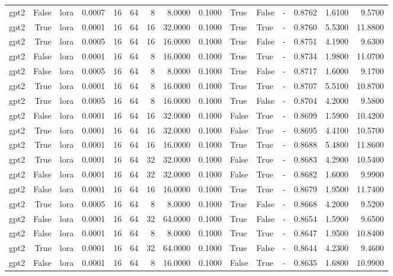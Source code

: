 \begin{tabular}{lrlrrrrrrlllrrr}
gpt2 & False & lora & 0.0007 & 16 & 64 & 8 & 8.0000 & 0.1000 & True & False & - & 0.8762 & 1.6100 & 9.5700 \\
gpt2 & True & lora & 0.0001 & 16 & 64 & 16 & 32.0000 & 0.1000 & True & True & - & 0.8760 & 5.5300 & 11.8800 \\
gpt2 & True & lora & 0.0005 & 16 & 64 & 16 & 16.0000 & 0.1000 & True & False & - & 0.8751 & 4.1900 & 9.6300 \\
gpt2 & False & lora & 0.0001 & 16 & 64 & 8 & 16.0000 & 0.1000 & True & True & - & 0.8734 & 1.9800 & 11.0700 \\
gpt2 & False & lora & 0.0005 & 16 & 64 & 8 & 8.0000 & 0.1000 & True & False & - & 0.8717 & 1.6000 & 9.1700 \\
gpt2 & True & lora & 0.0001 & 16 & 64 & 8 & 16.0000 & 0.1000 & True & True & - & 0.8707 & 5.5100 & 10.8700 \\
gpt2 & True & lora & 0.0005 & 16 & 64 & 8 & 16.0000 & 0.1000 & True & False & - & 0.8704 & 4.2000 & 9.5800 \\
gpt2 & False & lora & 0.0001 & 16 & 64 & 16 & 32.0000 & 0.1000 & False & True & - & 0.8699 & 1.5900 & 10.4200 \\
gpt2 & True & lora & 0.0001 & 16 & 64 & 16 & 32.0000 & 0.1000 & False & True & - & 0.8695 & 4.4100 & 10.5700 \\
gpt2 & True & lora & 0.0001 & 16 & 64 & 16 & 16.0000 & 0.1000 & True & True & - & 0.8688 & 5.4800 & 11.8600 \\
gpt2 & True & lora & 0.0001 & 16 & 64 & 32 & 32.0000 & 0.1000 & False & True & - & 0.8683 & 4.2900 & 10.5400 \\
gpt2 & False & lora & 0.0001 & 16 & 64 & 32 & 32.0000 & 0.1000 & False & True & - & 0.8682 & 1.6000 & 9.9900 \\
gpt2 & False & lora & 0.0001 & 16 & 64 & 16 & 16.0000 & 0.1000 & True & True & - & 0.8679 & 1.9500 & 11.7400 \\
gpt2 & True & lora & 0.0005 & 16 & 64 & 8 & 8.0000 & 0.1000 & True & False & - & 0.8668 & 4.2000 & 9.5200 \\
gpt2 & False & lora & 0.0001 & 16 & 64 & 32 & 64.0000 & 0.1000 & True & False & - & 0.8654 & 1.5900 & 9.6500 \\
gpt2 & False & lora & 0.0001 & 16 & 64 & 8 & 8.0000 & 0.1000 & True & True & - & 0.8647 & 1.9500 & 10.8400 \\
gpt2 & True & lora & 0.0001 & 16 & 64 & 32 & 64.0000 & 0.1000 & True & False & - & 0.8644 & 4.2300 & 9.4600 \\
gpt2 & False & lora & 0.0001 & 16 & 64 & 8 & 16.0000 & 0.1000 & False & True & - & 0.8635 & 1.6800 & 10.9900 \\

\end{tabular}
